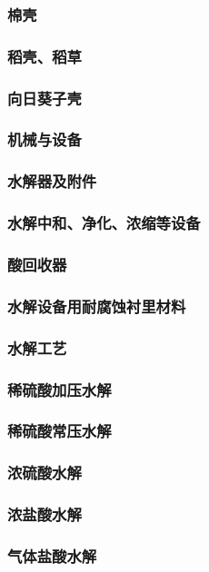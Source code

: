 \documentclass[UTF8]{../../ApplicationUniverse}
\begin{document}
            \subsubsection{棉壳}
            \subsubsection{稻壳、稻草}
            \subsubsection{向日葵子壳}
    \subsubsection{机械与设备}
        \subsubsection{水解器及附件}
        \subsubsection{水解中和、净化、浓缩等设备}
        \subsubsection{酸回收器}
        \subsubsection{水解设备用耐腐蚀衬里材料}
    \subsubsection{水解工艺}
        \subsubsection{稀硫酸加压水解}
        \subsubsection{稀硫酸常压水解}
        \subsubsection{浓硫酸水解}
        \subsubsection{浓盐酸水解}
        \subsubsection{气体盐酸水解}
\end{document}
